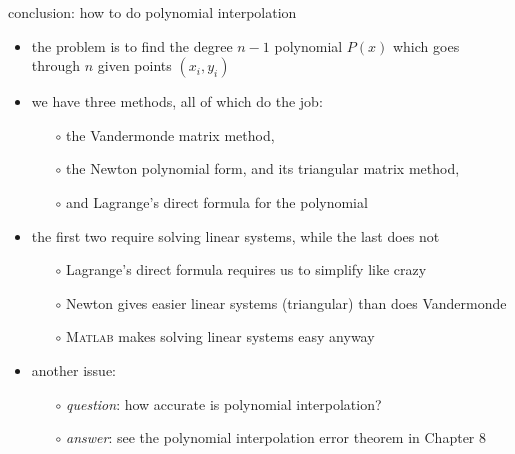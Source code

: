 \documentclass[10pt,hyperref]{beamer}
\newcommand{\Matlab}{\textsc{Matlab}\xspace}
\begin{document}
\begin{frame}{conclusion: how to do polynomial interpolation}

\begin{itemize}
\item the problem is to find the degree $n-1$ polynomial $P(x)$ which goes through $n$ given points $(x_i,y_i)$
\item we have three methods, all of which do the job:
  \begin{itemize}
  \item[$\circ$]  the Vandermonde matrix method,
  \item[$\circ$]  the Newton polynomial form, and its triangular matrix method,
  \item[$\circ$]  and Lagrange's direct formula for the polynomial
  \end{itemize}
\item the first two require solving linear systems, while the last does not
  \begin{itemize}
  \item[$\circ$] Lagrange's direct formula requires us to simplify like crazy
  \item[$\circ$] Newton gives easier linear systems (triangular) than does Vandermonde
  \item[$\circ$] \Matlab makes solving linear systems easy anyway
  \end{itemize}
\item another issue:
  \begin{itemize}
  \item[$\circ$] \emph{question}: how accurate is polynomial interpolation?
  \item[$\circ$] \emph{answer}: see the polynomial interpolation error theorem in Chapter 8
  \end{itemize}
\end{itemize}
\end{frame}
\end{document}
